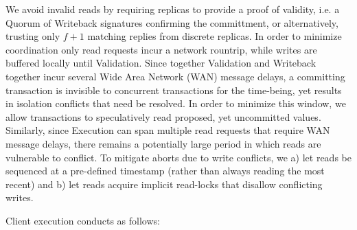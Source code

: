 We avoid invalid reads by requiring replicas to provide a proof of validity, i.e. a Quorum of Writeback signatures confirming the committment, or alternatively, trusting only $f+1$ matching replies from discrete replicas. In order to minimize coordination only read requests incur a network rountrip, while writes are buffered locally until Validation. 
Since together Validation and Writeback together incur several Wide Area Network (WAN) message delays, a committing transaction is invisible to concurrent transactions for the time-being, yet results in isolation conflicts that need be resolved. In order to minimize this window, we allow transactions to speculatively read proposed, yet uncommitted values. Similarly, since Execution can span multiple read requests that require WAN message delays, there remains a potentially large period in which reads are vulnerable to conflict. To mitigate aborts due to write conflicts, we a) let reads be sequenced at a pre-defined timestamp (rather than always reading the most recent) and b) let reads acquire implicit read-locks that disallow conflicting writes. 




Client execution conducts as follows:

